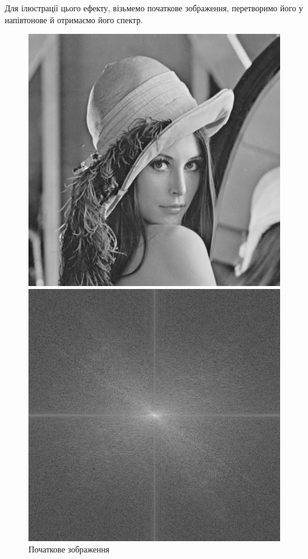 \documentclass{diploma}
\begin{document}
      Для ілюстрації цього ефекту, візьмемо початкове зображення, перетворимо
      його у напівтонове й отримаємо його спектр.
      \begin{figure}[!htb]
          \includegraphics[width=\linewidth]{Lenna-gray.png}
          \caption{Початкове зображення}\label{fig:Lenna-gray-img}
        \endminipage\hfill
          \includegraphics[width=\linewidth]{Lenna-ampl.png}

\end{figure}
\end{document}
